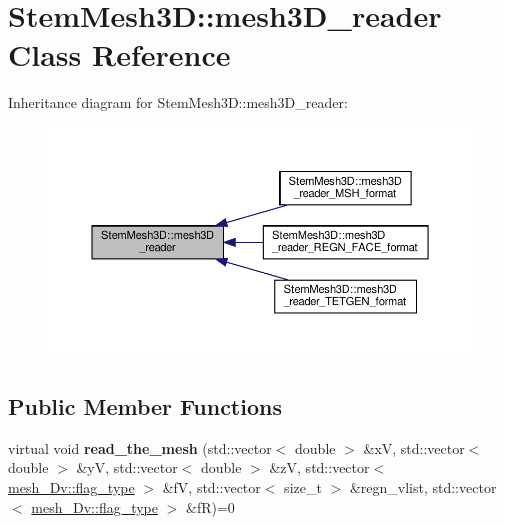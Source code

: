\hypertarget{classStemMesh3D_1_1mesh3D__reader}{}\section{Stem\+Mesh3D\+:\+:mesh3\+D\+\_\+reader Class Reference}
\label{classStemMesh3D_1_1mesh3D__reader}


Inheritance diagram for Stem\+Mesh3D\+:\+:mesh3\+D\+\_\+reader\+:\nopagebreak
\begin{figure}[H]
\begin{center}
\leavevmode
\includegraphics[width=350pt]{classStemMesh3D_1_1mesh3D__reader__inherit__graph}
\end{center}
\end{figure}
\subsection*{Public Member Functions}
\begin{DoxyCompactItemize}
\item 
\mbox{\label{classStemMesh3D_1_1mesh3D__reader_adc698cd5b3b732eaba1772a3c99892bd}} 
virtual void {\bfseries read\+\_\+the\+\_\+mesh} (std\+::vector$<$ double $>$ \&xV, std\+::vector$<$ double $>$ \&yV, std\+::vector$<$ double $>$ \&zV, std\+::vector$<$ \hyperlink{classStemMesh3D_1_1mesh__3Dv_a9544cba555b60f17f04fcd1689314338}{mesh\+\_\+Dv\+::flag\+\_\+type} $>$ \&fV, std\+::vector$<$ size\+\_\+t $>$ \&regn\+\_\+vlist, std\+::vector$<$ \hyperlink{classStemMesh3D_1_1mesh__3Dv_a9544cba555b60f17f04fcd1689314338}{mesh\+\_\+Dv\+::flag\+\_\+type} $>$ \&fR)=0
\end{DoxyCompactItemize}
